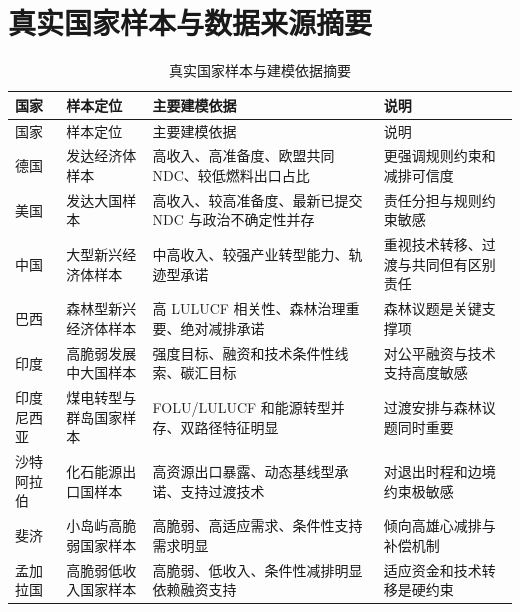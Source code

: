 \documentclass[12pt,a4paper]{ctexart}
\begin{document}
\section{真实国家样本与数据来源摘要}
\begin{longtable}{>{\raggedright\arraybackslash}p{2cm} >{\raggedright\arraybackslash}p{2.5cm} >{\raggedright\arraybackslash}p{4.8cm} >{\raggedright\arraybackslash}p{4.8cm}}
\caption{真实国家样本与建模依据摘要}\label{tab:countries}\\
\toprule
国家 & 样本定位 & 主要建模依据 & 说明 \\
\midrule
\endfirsthead
\toprule
国家 & 样本定位 & 主要建模依据 & 说明 \\
\midrule
\endhead
德国 & 发达经济体样本 & 高收入、高准备度、欧盟共同 NDC、较低燃料出口占比 & 更强调规则约束和减排可信度 \\
美国 & 发达大国样本 & 高收入、较高准备度、最新已提交 NDC 与政治不确定性并存 & 责任分担与规则约束敏感 \\
中国 & 大型新兴经济体样本 & 中高收入、较强产业转型能力、轨迹型承诺 & 重视技术转移、过渡与共同但有区别责任 \\
巴西 & 森林型新兴经济体样本 & 高 LULUCF 相关性、森林治理重要、绝对减排承诺 & 森林议题是关键支撑项 \\
印度 & 高脆弱发展中大国样本 & 强度目标、融资和技术条件性线索、碳汇目标 & 对公平融资与技术支持高度敏感 \\
印度尼西亚 & 煤电转型与群岛国家样本 & FOLU/LULUCF 和能源转型并存、双路径特征明显 & 过渡安排与森林议题同时重要 \\
沙特阿拉伯 & 化石能源出口国样本 & 高资源出口暴露、动态基线型承诺、支持过渡技术 & 对退出时程和边境约束极敏感 \\
斐济 & 小岛屿高脆弱国家样本 & 高脆弱、高适应需求、条件性支持需求明显 & 倾向高雄心减排与补偿机制 \\
孟加拉国 & 高脆弱低收入国家样本 & 高脆弱、低收入、条件性减排明显依赖融资支持 & 适应资金和技术转移是硬约束 \\
\bottomrule
\end{longtable}
\end{document}
